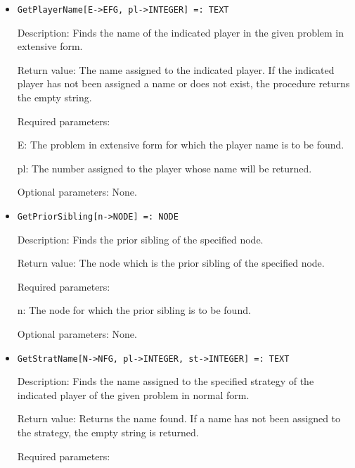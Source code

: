 \begin{itemize}
\item
\protect \large \begin{verbatim}
GetPlayerName[E->EFG, pl->INTEGER] =: TEXT
\end{verbatim}\normalsize

\bd
\item
[Description:] Finds the name of the indicated player in the given
problem in extensive form.
\item
[Return value:] The name assigned to the indicated player.  If the
indicated player has not been assigned a name or does not exist, the
procedure returns the empty string.
\item
[Required parameters:]\hfil\null

\bd
\item  
[E:] The problem in extensive form for which the player name is to be
found.
\item
[pl:] The number assigned to the player whose name will be returned.
\ed

\item
[Optional parameters:] None.
\ed

\item
\protect \large \begin{verbatim}
GetPriorSibling[n->NODE] =: NODE
\end{verbatim}\normalsize

\bd
\item
[Description:] Finds the prior sibling of the specified node.
\item
[Return value:] The node which is the prior sibling of the specified
node.
\item
[Required parameters:]\hfil\null

\bd
\item
[n:] The node for which the prior sibling is to be found.
\ed

\item
[Optional parameters:] None.
\ed

\item
\protect \large \begin{verbatim}
GetStratName[N->NFG, pl->INTEGER, st->INTEGER] =: TEXT
\end{verbatim}\normalsize

\bd
\item
[Description:] Finds the name assigned to the specified strategy of
the indicated player of the given problem in normal form.
\item
[Return value:] Returns the name found.  If a name has not been
assigned to the strategy, the empty string is returned.
\item
[Required parameters:]\hfil\null


\end{itemize}
